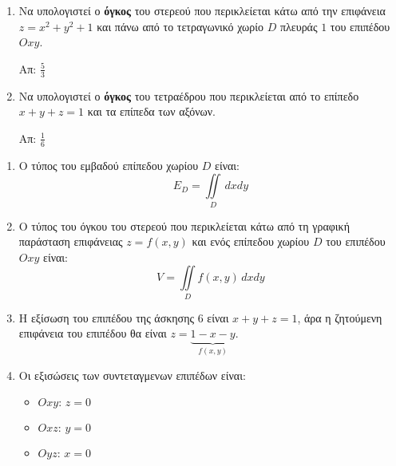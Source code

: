 \begin{enumerate}
\begin{enumerate}[i)]
\end{enumerate}

\vspace{\baselineskip}

\item Να υπολογιστεί ο \textbf{όγκος} του στερεού που περικλείεται κάτω από την επιφάνεια $z=x^2+y^2+1$ και πάνω από το τετραγωνικό χωρίο $D$ πλευράς $1$ του επιπέδου $Oxy$.

\hfill Απ: $\frac{5}{3}$

\vspace{\baselineskip}



\item Να υπολογιστεί ο \textbf{όγκος} του τετραέδρου που περικλείεται από το επίπεδο $x+y+z=1$ και τα επίπεδα των αξόνων. 

\hfill Απ: $\frac{1}{6}$ 



\end{enumerate}

\pagebreak

\begin{center}
\end{center}

\vspace{\baselineskip}

\begin{enumerate}

\item Ο τύπος του εμβαδού επίπεδου χωρίου $D$ είναι: 
\[
E_{D}=\iint\limits_{D}\,dxdy
\]

\vspace{\baselineskip}

\item Ο τύπος του όγκου του στερεού που περικλείεται κάτω από τη γραφική παράσταση επιφάνειας $z=f(x,y)$ και ενός επίπεδου χωρίου $D$ του επιπέδου $Oxy$ είναι: 
\[
V=\iint\limits_{D}f(x,y)\,dxdy
\]

\vspace{\baselineskip}

\item Η εξίσωση του επιπέδου της άσκησης $6$ είναι $x+y+z=1$, άρα η ζητούμενη επιφάνεια του επιπέδου θα είναι $z=\underbrace{1-x-y}_{f(x,y)}$.

\vspace{\baselineskip}

\item Οι εξισώσεις των συντεταγμενων επιπέδων είναι:
\begin{itemize}
\item $Oxy: \, z=0$
\item $Oxz: \, y=0$
\item $Oyz: \, x=0$
\end{itemize}



\end{enumerate}





